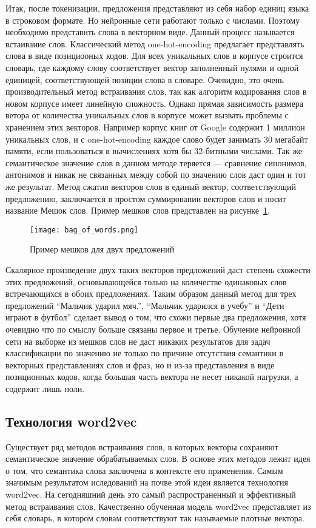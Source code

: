 Итак, после токенизации, предложения представляют из себя набор единиц языка в строковом формате. Но нейронные сети работают только с числами. Поэтому необходимо представить слова в векторном виде. Данный процесс называется встаивание слов. Классический метод one-hot-encoding предлагает представлять слова в виде позициооных кодов. Для всех уникальных слов в корпусе строится словарь, где каждому слову соответствует вектор заполненный нулями и одной единицей, соответствующей позиции слова в словаре. Очевидно, это очень производительный метод встраивания слов, так как алгоритм кодирования слов в новом корпусе имеет линейную сложность. Однако прямая зависимость размера ветора от количества уникальных слов в корпусе может вызвать проблемы с хранением этих векторов. Например корпус книг от Google содержит 1 миллион уникальных слов, и с one-hot-encoding каждое слово будет занимать 30 мегабайт памяти, если пользоваться в вычислениях хотя бы 32-битными числами. Так же семантическое значение слов в данном методе теряется --- сравнение синонимов, антонимов и никак не связанных между собой по значению слов даст один и тот же результат. Метод сжатия векторов слов в единый вектор, соответствующий предложению, заключается в простом суммировании векторов слов и носит название Мешок слов. Пример мешков слов представлен на рисунке~\ref{fig:overview:bag_of_words}.

\begin{figure}
\centering
  \texttt{[image: bag\_of\_words.png]}
  \caption{Пример мешков для двух предложений}\label{fig:overview:bag_of_words}
\end{figure}

Скалярное произведение двух таких векторов предложений даст степень схожести этих предложений, основывающейся только на количестве одинаковых слов встречающихся в обоих предложениях. Таким образом данный метод для трех предложений ``Мальчик ударил мяч.'', ``Мальчик ударился в учебу'' и ``Дети играют в футбол'' сделает вывод о том, что схожи первые два предложения, хотя очевидно что по смыслу больше связаны первое и третье. Обучение нейронной сети на выборке из мешков слов не даст никаких результатов для задач классификации по значению не только по причине отсутствия семантики в векторных представлениях слов и фраз, но и из-за представления в виде позиционных кодов, когда большая часть вектора не несет никакой нагрузки, а содержит лишь ноли.\cite{Goodfellow-et-al-2016}
\subsection{Технология word2vec}\label{subsec:overview:overview_word2vec}
Существует ряд методов встраивания слов, в которых векторы сохраняют семантическое значение обрабатываемых слов. В основе этих методов лежит идея о том, что семантика слова заключена в контексте его применения. Самым значимым результатом иследований на почве этой идеи является технология word2vec. На сегодняшний день это самый распространенный и эффективный метод встраивания слов. Качественно обученная модель word2vec представляет из себя словарь, в котором словам соответствуют так называемые плотные вектора.

